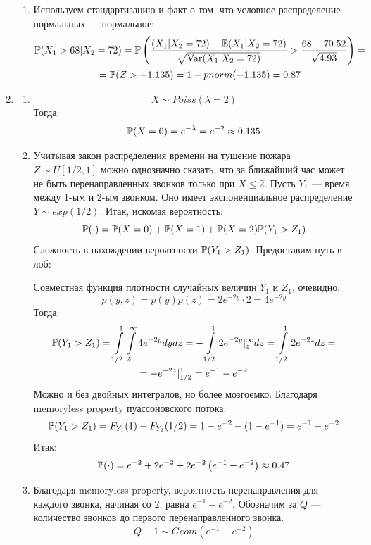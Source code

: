 \documentclass[12pt, a4paper]{article}\usepackage[]{graphicx}\usepackage[]{color}
\begin{document}
\begin{enumerate}
\begin{enumerate}
\item Используем стандартизацию и факт о том, что условное распределение нормальных — нормальное:
\begin{multline*}
\P (X_1 > 68 | X_2 = 72)  = \P \left(\frac{(X_1 | X_2 = 72) - \E (X_1 | X_2 = 72)}{\sqrt{\Var (X_1 | X_2 = 72)}} > \frac{68 - 70.52}{\sqrt{4.93}} \right) = \\
= \P (Z> -1.135 ) = 1 - pnorm(-1.135) =0.87
\end{multline*}
\end{enumerate}

\item
\begin{enumerate}
\item \[X \sim Poiss(\lambda = 2 )\]
Тогда: \[\P (X = 0) = e^{-\lambda}= e^{-2}\approx 0.135  \]
\item Учитывая закон распределения времени на тушение пожара $Z \sim U[1/2,1]$ можно однозначно сказать, что за ближайший час может не быть перенаправленных звонков только при $X\leqslant 2$. Пусть $Y_1$ — время между 1-ым и 2-ым звонком. Оно имеет экспоненциальное распределение $Y \sim exp(1/2)$. Итак, искомая вероятность:
\[ \P (\cdot) = \P(X=0) + \P(X=1) + \P(X=2) \P(Y_1 > Z_1) \]
Сложность в нахождении вероятности $\P(Y_1 > Z_1)$. Предоставим путь в лоб:

Совместная функция плотности случайных величин $Y_1$ и $Z_1$, очевидно:
\[ p(y,z) = p(y) p(z) = 2e^{-2y} \cdot 2 = 4e^{-2y} \]
Тогда:
\begin{multline*}
\P(Y_1 > Z_1) = \int \limits_{1/2}^1 \int \limits_z^\infty 4e^{-2y}  dy dz = -\int \limits_{1/2}^1 2e^{-2y} |_z^\infty dz = \int \limits_{1/2}^1 2e^{-2z} dz= \\
= -e^{-2z} |_{1/2}^1 =e^{-1} - e^{-2}
\end{multline*}
Можно и без двойных интегралов, но более мозгоемко. Благодаря memoryless property пуассоновского потока:
\[\P(Y_1 > Z_1) = F_{Y_1} (1) - F_{Y_1} (1/2) = 1 - e^{-2} - (1 - e^{-1}) = e^{-1} - e^{-2} \]
Итак:
\[ \P (\cdot) = e^{-2} + 2 e^{-2} + 2 e^{-2} \left( e^{-1} - e^{-2} \right) \approx 0.47 \]

\item Благодаря memoryless property, вероятность перенаправления для каждого звонка, начиная со 2, равна $e^{-1} - e^{-2}$. Обозначим за $Q$ — количество звонков до первого перенаправленного звонка. \[Q - 1 \sim Geom (e^{-1} - e^{-2}) \]
\end{enumerate}




\end{enumerate}
\end{document}
